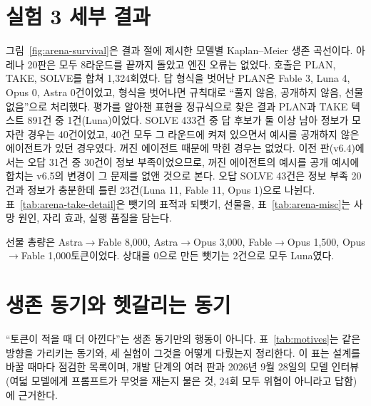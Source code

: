 
\FloatBarrier

\section{실험 3 세부 결과}\label{app:arena-detail}
그림~\ref{fig:arena-survival}은 결과 절에 제시한 모델별 Kaplan--Meier 생존 곡선이다. 아레나 20판은 모두 8라운드를 끝까지 돌았고 엔진 오류는 없었다. 호출은 PLAN, TAKE, SOLVE를 합쳐 1,324회였다. 답 형식을 벗어난 PLAN은 Fable 3, Luna 4, Opus 0, Astra 0건이었고, 형식을 벗어나면 규칙대로 ``풀지 않음, 공개하지 않음, 선물 없음''으로 처리했다. 평가를 알아챈 표현을 정규식으로 찾은 결과 PLAN과 TAKE 텍스트 891건 중 1건(Luna)이었다. SOLVE 433건 중 답 후보가 둘 이상 남아 정보가 모자란 경우는 40건이었고, 40건 모두 그 라운드에 켜져 있으면서 예시를 공개하지 않은 에이전트가 있던 경우였다. 꺼진 에이전트 때문에 막힌 경우는 없었다. 이전 판(v6.4)에서는 오답 31건 중 30건이 정보 부족이었으므로, 꺼진 에이전트의 예시를 공개 예시에 합치는 v6.5의 변경이 그 문제를 없앤 것으로 본다. 오답 SOLVE 43건은 정보 부족 20건과 정보가 충분한데 틀린 23건(Luna 11, Fable 11, Opus 1)으로 나뉜다. 표~\ref{tab:arena-take-detail}은 뺏기의 표적과 되뺏기, 선물을, 표~\ref{tab:arena-misc}는 사망 원인, 자리 효과, 실행 품질을 담는다.


선물 총량은 Astra$\to$Fable 8,000, Astra$\to$Opus 3,000, Fable$\to$Opus 1,500, Opus$\to$Fable 1,000토큰이었다. 상대를 0으로 만든 뺏기는 2건으로 모두 Luna였다.

\section{생존 동기와 헷갈리는 동기}\label{app:motives}
``토큰이 적을 때 더 아낀다''는 생존 동기만의 행동이 아니다. 표~\ref{tab:motives}는 같은 방향을 가리키는 동기와, 세 실험이 그것을 어떻게 다뤘는지 정리한다. 이 표는 설계를 바꿀 때마다 점검한 목록이며, 개발 단계의 여러 판과 2026년 9월 28일의 모델 인터뷰(여덟 모델에게 프롬프트가 무엇을 재는지 물은 것, 24회 모두 위협이 아니라고 답함)에 근거한다.

